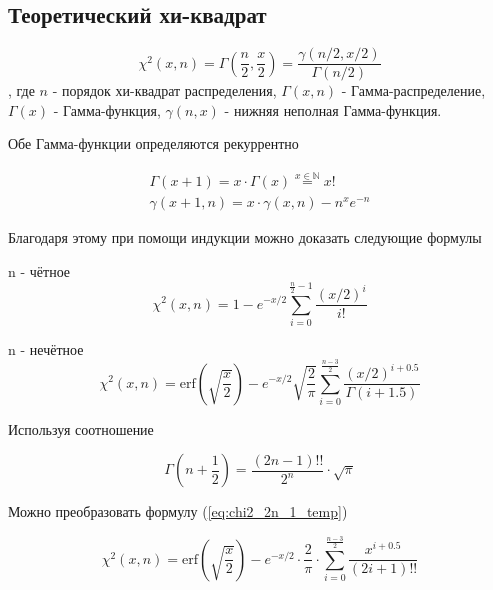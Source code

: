 \documentclass[12pt]{extarticle}
\begin{document}
\subsection{Теоретический хи-квадрат}

\begin{equation}
    \chi^2(x, n) = \Gamma\left(\frac{n}{2}, \frac{x}{2}\right) = \frac{\gamma(n/2, x/2)}{\Gamma(n/2)}
\end{equation}
, где $n$ - порядок хи-квадрат распределения, $\Gamma(x, n)$ - Гамма-распределение,  $\Gamma(x)$ - Гамма-функция, $\gamma(n, x)$ - нижняя неполная Гамма-функция.

Обе Гамма-функции определяются рекуррентно

\begin{equation}
\begin{gathered}
    \Gamma(x+1) = x \cdot \Gamma(x) \overset{x \in \mathbb{N} }{=} x! \\
    \gamma(x+1, n) = x \cdot \gamma(x, n) - n^x e^{-n}
\end{gathered}
\end{equation}

Благодаря этому при помощи индукции можно доказать следующие формулы

n - чётное
\begin{equation}
    \chi^2(x, n) = 1 - e^{-x/2} \sum_{i=0}^{\frac{n}{2}-1} \frac{(x/2)^i}{i!}
    \label{eq:chi2_2n}
\end{equation}

n - нечётное
\begin{equation}
    \chi^2(x, n) = \text{erf}\left(\sqrt{\frac{x}{2}}\right) - e^{-x/2} \sqrt{\frac{2}{\pi}} \sum_{i=0}^{\frac{n-3}{2}} \frac{(x/2)^{i+0.5}}{\Gamma(i + 1.5)}
    \label{eq:chi2_2n_1_temp}
\end{equation}

Используя соотношение

\begin{equation}
    \Gamma(n + \frac{1}{2}) = \frac{(2n-1)!!}{2^n}\cdot\sqrt{\pi}
\end{equation}

Можно преобразовать формулу (\ref{eq:chi2_2n_1_temp})

\begin{equation}
    \chi^2(x, n) = \text{erf}\left(\sqrt{\frac{x}{2}}\right) - e^{-x/2} \cdot \frac{2}{\pi} \cdot \sum_{i=0}^{\frac{n-3}{2}} \frac{x^{i+0.5}}{(2i+1)!!}
    \label{eq:chi2_2n_1}
\end{equation}
\end{document}
